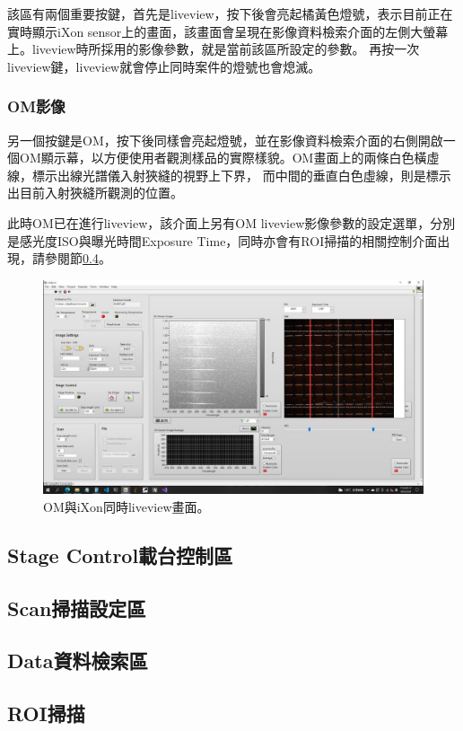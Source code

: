 \documentclass[12pt]{article}
\begin{document}
    該區有兩個重要按鍵，首先是liveview，按下後會亮起橘黃色燈號，表示目前正在實時顯示iXon sensor上的畫面，該畫面會呈現在影像資料檢索介面的左側大螢幕上。liveview時所採用的影像參數，就是當前該區所設定的參數。
    再按一次liveview鍵，liveview就會停止同時案件的燈號也會熄滅。
    \subsubsection{OM影像}
    另一個按鍵是OM，按下後同樣會亮起燈號，並在影像資料檢索介面的右側開啟一個OM顯示幕，以方便使用者觀測樣品的實際樣貌。OM畫面上的兩條白色橫虛線，標示出線光譜儀入射狹縫的視野上下界，
    而中間的垂直白色虛線，則是標示出目前入射狹縫所觀測的位置。
    
    此時OM已在進行liveview，該介面上另有OM liveview影像參數的設定選單，分別是感光度ISO與曝光時間Exposure Time，同時亦會有ROI掃描的相關控制介面出現，請參閱節\ref{sec: roi scan}。
    \begin{figure}[h]
        \centering
        \includegraphics[width=\linewidth]{roi.jpeg}
        \caption{OM與iXon同時liveview畫面。}
        \label{fig: liveview}
    \end{figure}

    \subsection{Stage Control載台控制區}
    \subsection{Scan掃描設定區}
    \subsection{Data資料檢索區}
    \subsection{ROI掃描}\label{sec: roi scan}
\end{document}
